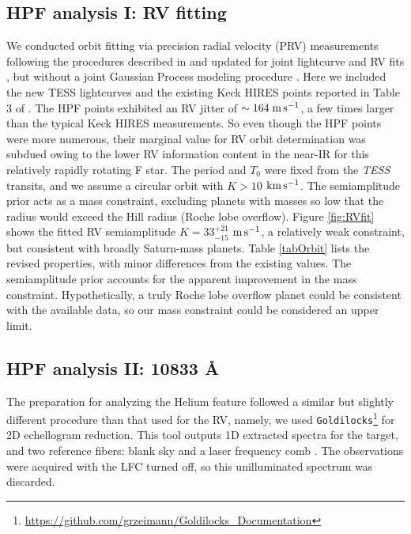\documentclass[twocolumn]{aastex631}
\newcommand{\ms}{\ensuremath{\rm m\,s^{-1}}}
\newcommand{\kms}{\ensuremath{\rm km\,s^{-1}}}
\begin{document}
\subsection{HPF analysis I: RV fitting}\label{secRVfit}

We conducted orbit fitting via precision radial velocity (PRV) measurements following the procedures described in \citet{2021AJ....161..173T} and updated for joint lightcurve and RV fits \citep{2022AJ....163..225T}, but without a joint Gaussian Process modeling procedure \citep{2023ApJ...950..162T}.  Here we included the new TESS lightcurves and the existing Keck HIRES points reported in Table 3 of \citet{2017AJ....153..211Z}.  The HPF points exhibited an RV jitter of $\sim164\;\ms$, a few times larger than the typical Keck HIRES measurements.  So even though the HPF points were more numerous, their marginal value for RV orbit determination was subdued owing to the lower RV information content in the near-IR for this relatively rapidly rotating F star.  The period and $T_0$ were fixed from the \emph{TESS} transits, and we assume a circular orbit with $K>10$ \kms.  The semiamplitude prior acts as a mass constraint, excluding planets with masses so low that the radius would exceed the Hill radius (Roche lobe overflow).  Figure \ref{fig:RVfit} shows the fitted RV semiamplitude $K=33_{-15}^{+21}$ \ms, a relatively weak constraint, but consistent with broadly Saturn-mass planets.  Table \ref{tabOrbit} lists the revised properties, with minor differences from the existing values.  The semiamplitude prior accounts for the apparent improvement in the mass constraint.  Hypothetically, a truly Roche lobe overflow planet could be consistent with the available data, so our mass constraint could be considered an upper limit.


\subsection{HPF analysis II:  10833 \AA} \label{secHeAnalysis}
The preparation for analyzing the Helium feature followed a similar but slightly different procedure than that used for the RV, namely, we used \texttt{Goldilocks}\footnote{\url{https://github.com/grzeimann/Goldilocks_Documentation}} for 2D echellogram reduction.  This tool outputs 1D extracted spectra for the target, and two reference fibers: blank sky and a laser frequency comb \citep[LFC,][]{2019Optic...6..233M}.  The observations were acquired with the LFC turned off, so this unilluminated spectrum was discarded.
\end{document}

